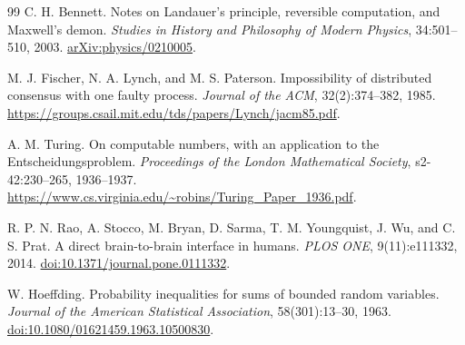 \begin{thebibliography}{99}
C. H. Bennett. Notes on Landauer's principle, reversible computation, and Maxwell's demon. \emph{Studies in History and Philosophy of Modern Physics}, 34:501--510, 2003. \href{https://arxiv.org/abs/physics/0210005}{arXiv:physics/0210005}.

M. J. Fischer, N. A. Lynch, and M. S. Paterson. Impossibility of distributed consensus with one faulty process. \emph{Journal of the ACM}, 32(2):374--382, 1985. \url{https://groups.csail.mit.edu/tds/papers/Lynch/jacm85.pdf}.

A. M. Turing. On computable numbers, with an application to the Entscheidungsproblem. \emph{Proceedings of the London Mathematical Society}, s2-42:230--265, 1936--1937. \url{https://www.cs.virginia.edu/~robins/Turing_Paper_1936.pdf}.

R. P. N. Rao, A. Stocco, M. Bryan, D. Sarma, T. M. Youngquist, J. Wu, and C. S. Prat. A direct brain-to-brain interface in humans. \emph{PLOS ONE}, 9(11):e111332, 2014. \href{https://doi.org/10.1371/journal.pone.0111332}{doi:10.1371/journal.pone.0111332}.

W. Hoeffding. Probability inequalities for sums of bounded random variables. \emph{Journal of the American Statistical Association}, 58(301):13--30, 1963. \href{https://doi.org/10.1080/01621459.1963.10500830}{doi:10.1080/01621459.1963.10500830}.
\end{thebibliography}
